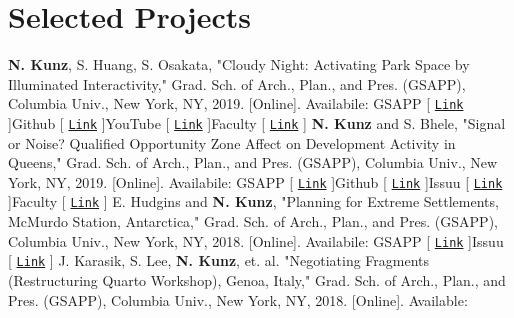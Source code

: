 \documentclass{article}
\begin{document}
    \section*{Selected Projects}
        \textbf{N. Kunz}, S. Huang, S. Osakata, "Cloudy Night: Activating Park Space by Illuminated Interactivity," Grad. Sch. of Arch., Plan., and Pres. (GSAPP), Columbia Univ., New York, NY, 2019. [Online]. Availabile:\newline\newline
        \faTrain\space GSAPP [ \href{https://www.arch.columbia.edu/student-work/7502-cloudy-night}{\texttt{Link}} ]\space\faGithub\space Github [ \href{https://github.com/nickkunz/cloudynight}{\texttt{Link}} ]\space\space \faYoutube\space YouTube [ \href{https://www.youtube.com/watch?v=GWaXrN79Lbw&feature=emb_title}{\texttt{Link}} ]\space\faCertificate\space Faculty [ \href{https://edblogs.columbia.edu/plana6102-001-2019-1/2019/05/10/cloudy-night-activating-park-space-by-illuminated-interactivity-2/}{\texttt{Link}} ]\newline\newline
        \textbf{N. Kunz} and S. Bhele, "Signal or Noise? Qualified Opportunity Zone Affect on Development Activity in Queens," Grad. Sch. of Arch., Plan., and Pres. (GSAPP), Columbia Univ., New York, NY, 2019. [Online]. Availabile:\newline\newline
        \faTrain\space GSAPP [ \href{https://cdn.filepicker.io/api/file/guXiVLU6QreQgKPPPUG8?&fit=max}{\texttt{Link}} ]\space\faGithub\space Github [ \href{https://github.com/nickkunz/queens-dbscan}{\texttt{Link}} ]\space\faBook\space Issuu [ \href{https://issuu.com/nickkunz/docs/queens_report}{\texttt{Link}} ]\space\faCertificate\space Faculty [ \href{https://www.leahmeisterlin.com/advanced-spatial-analysis-2019}{\texttt{Link}} ]\newline\newline
        E. Hudgins and \textbf{N. Kunz}, "Planning for Extreme Settlements, McMurdo Station, Antarctica," Grad. Sch. of Arch., Plan., and Pres. (GSAPP), Columbia Univ., New York, NY, 2018. [Online]. Availabile:\newline\newline
        \faTrain\space GSAPP [ \href{https://www.arch.columbia.edu/student-work/5461}{\texttt{Link}} ]\space\faBook\space Issuu [ \href{https://issuu.com/nickkunz/docs/mcmurdo}{\texttt{Link}} ]\newline\newline
        J. Karasik, S. Lee, \textbf{N. Kunz}, et. al. "Negotiating Fragments (Restructuring Quarto Workshop), Genoa, Italy," Grad. Sch. of Arch., Plan., and Pres. (GSAPP), Columbia Univ., New York, NY, 2018. [Online]. Available:\newline\newline
\end{document}
